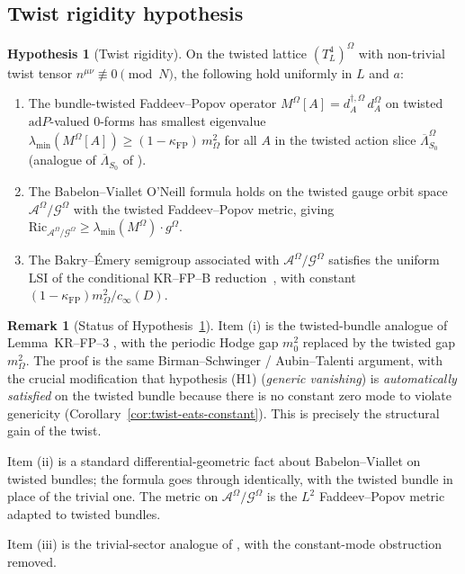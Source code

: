 \documentclass[11pt,a4paper]{amsart}
\theoremstyle{definition}
\newtheorem{remark}[theorem]{Remark}
\newtheorem{hypothesis}[theorem]{Hypothesis}
\newcommand{\Ric}{\mathrm{Ric}}
\newcommand{\ad}{\mathrm{ad}}
\newcommand{\kFP}{\kappa_{\mathrm{FP}}}
\newcommand{\cinf}{c_{\infty}}
\begin{document}
\subsection{Twist rigidity hypothesis}

\begin{hypothesis}[Twist rigidity]\label{hyp:twist-rigidity}
On the twisted lattice $(T^4_L)^\Omega$ with non-trivial twist tensor
$n^{\mu\nu} \not\equiv 0 \pmod N$, the following hold uniformly in
$L$ and $a$:
\begin{enumerate}[label=(\roman*),leftmargin=2em]
\item The bundle-twisted Faddeev--Popov operator
$M^\Omega[A] = d_A^{\dagger,\Omega}\,d_A^\Omega$ on twisted
$\ad P$-valued $0$-forms has smallest eigenvalue
$\lambda_{\min}(M^\Omega[A]) \geq (1-\kFP)\,m_\Omega^2$ for all
$A$ in the twisted action slice
$\overline\Lambda^\Omega_{S_0}$ (analogue of $\overline\Lambda_{S_0}$ of
\cite{RemondiereKRFP3_2026}).
\item The Babelon--Viallet O'Neill formula holds on the twisted gauge
orbit space $\mathcal A^\Omega / \mathcal G^\Omega$ with the
twisted Faddeev--Popov metric, giving
$\Ric_{\mathcal A^\Omega/\mathcal G^\Omega} \geq \lambda_{\min}(M^\Omega) \cdot g^\Omega$.
\item The Bakry--\'Emery semigroup associated with $\mathcal A^\Omega
/\mathcal G^\Omega$ satisfies the uniform LSI of the conditional
KR--FP--B reduction~\cite{RemondiereKRFPB_2026}, with constant
$(1-\kFP)m_\Omega^2 / \cinf(D)$.
\end{enumerate}
\end{hypothesis}

\begin{remark}[Status of Hypothesis~\ref{hyp:twist-rigidity}]
\label{rem:status-hyp}
Item (i) is the twisted-bundle analogue of Lemma~KR--FP--3
\cite[Thm.~3.1]{RemondiereKRFP3_2026}, with the periodic Hodge gap
$m_0^2$ replaced by the twisted gap $m_\Omega^2$. The proof is the same
Birman--Schwinger / Aubin--Talenti argument, with the crucial
modification that hypothesis (H1) (\emph{generic vanishing}) is
\emph{automatically satisfied} on the twisted bundle because there is
no constant zero mode to violate genericity (Corollary~\ref{cor:twist-eats-constant}).
This is precisely the structural gain of the twist.

Item (ii) is a standard differential-geometric fact about Babelon--Viallet
on twisted bundles; the formula goes through identically, with the
twisted bundle in place of the trivial one. The metric on
$\mathcal A^\Omega/\mathcal G^\Omega$ is the $L^2$ Faddeev--Popov metric
adapted to twisted bundles.

Item (iii) is the trivial-sector analogue of
\cite[Thm.~6.1]{RemondiereKRFPB_2026}, with the constant-mode obstruction
removed.
\end{remark}
\end{document}
